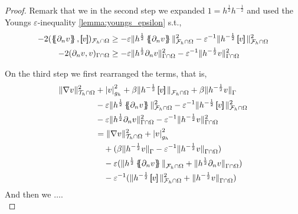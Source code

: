 \begin{proof}
Remark that we in the second step we expanded $ 1 =  h^{\frac{1}{2}} h^{-\frac{1}{2}}$ and used the Youngs $\varepsilon $-inequality \ref{lemma:youngs_epsilon} s.t.,
 \[
     \begin{split}
         - 2( \mean{ \partial _{n} v  },  \jump{ v })_{\mathcal{F} _{h} \cap \Omega } &\ge - \varepsilon \| h^{\frac{1}{2}}  \mean{  \partial _{n} v}      \|_{ \mathcal{F} _{h} \cap \Omega  }^{2  }
  - \varepsilon ^{-1} \| h^{-\frac{1}{2}} \jump{ v }   \|_{\mathcal{F} _{h} \cap \Omega   }^{ 2 } \\
- 2 ( \partial _{n} v,v)_{\Gamma \cap \Omega }   &\ge- \varepsilon \| h^{\frac{1}{2}} \partial _{n} v \|_{ \Gamma \cap \Omega  }^{2  }
-  \varepsilon ^{-1} \| h^{-\frac{1}{2}} v \|_{  \Gamma \cap  \Omega }^{ 2 }
     \end{split}
 \]

 On the third step we first rearranged the terms, that is,
 \[
     \begin{split}
   \| \nabla v \|_{ \mathcal{T}_{h} \cap  \Omega }^{ 2 } & + \left\lvert v \right\rvert_{ g_{h} }^{ 2 } + \beta \| h^{-\frac{1}{2}} \jump{ v }   \|_{\mathcal{F} _{h} \cap \Omega   }^{  }   + \beta \| h^{-\frac{1}{2}}  v    \|_{ \Gamma}^{  }
\\  &- \varepsilon \| h^{\frac{1}{2}}  \mean{  \partial _{n} v}      \|_{ \mathcal{F} _{h} \cap \Omega  }^{2  } - \varepsilon ^{-1} \| h^{-\frac{1}{2}} \jump{ v }   \|_{\mathcal{F} _{h} \cap \Omega   }^{ 2 }
\\ &-  \varepsilon \| h^{\frac{1}{2}} \partial _{n} v \|_{ \Gamma \cap \Omega  }^{2  } -  \varepsilon ^{-1} \| h^{-\frac{1}{2}} v \|_{  \Gamma \cap  \Omega }^{ 2 } \\
&=  \| \nabla v \|_{ \mathcal{T}_{h} \cap  \Omega }^{ 2 }  + \left\lvert v \right\rvert_{ g_{h} }^{ 2 } \\
&\quad  + ( \beta \| h^{-\frac{1}{2}} v \|_{\Gamma   }^{  } - \varepsilon ^{ -1}\| h^{-\frac{1}{2}} v \|_{\Gamma \cap \Omega    }^{  } )  \\
&\quad  -  \varepsilon ( \| h^{\frac{1}{2}} \mean{ \partial _{n} v }    \|_{  \mathcal{F}_{h} \cap \Omega  }^{  } + \| h^{\frac{1}{2}} \partial _{n} v \|_{ \Gamma \cap \Omega  }^{  }  ) \\
&\quad  - \varepsilon ^{-1} ( \| h^{-\frac{1}{2}} \jump{ v }   \|_{ \mathcal{F}_{h} \cap \Omega   }^{2  } + \| h^{-\frac{1}{2}} v \|_{ \Gamma \cap \Omega   }^{  }  )
     \end{split}
 \]
 And then we $\ldots$.
 \\

\end{proof}

